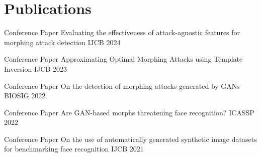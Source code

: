 

\section{Publications}
\begin{cvhonors}

  \cvhonor
    {Conference Paper} %
    {Evaluating the effectiveness of attack-agnostic features for morphing attack detection} %
    {IJCB} %
    {2024} %

  \cvhonor
    {Conference Paper} %
    {Approximating Optimal Morphing Attacks using Template Inversion} %
    {IJCB} %
    {2023} %

  \cvhonor
    {Conference Paper} %
    {On the detection of morphing attacks generated by GANs} %
    {BIOSIG} %
    {2022} %

  \cvhonor
    {Conference Paper} %
    {Are GAN-based morphs threatening face recognition?} %
    {ICASSP} %
    {2022} %

  \cvhonor
    {Conference Paper} %
    {On the use of automatically generated synthetic image datasets for benchmarking face recognition} %
    {IJCB} %
    {2021} %

\end{cvhonors}
